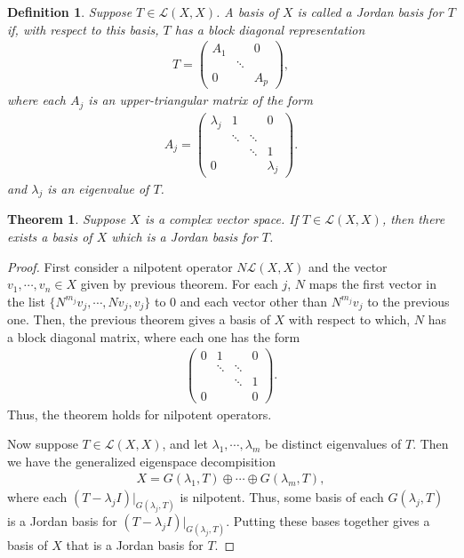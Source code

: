\documentclass[11pt]{book}
\newtheorem{definition}{Definition}[chapter]
\newtheorem{theorem}{Theorem}[chapter]
\theoremstyle{definition}
\numberwithin{equation}{chapter}
\begin{document}
\medskip

\begin{definition}
Suppose $T\in\mathcal{L}(X,X)$. A basis of $X$ is called a Jordan basis for $T$ if, with respect to this basis, $T$ has a block diagonal representation
\begin{align*}
    T = \begin{pmatrix}
    A_1 &  & 0 \\
     & \ddots &  \\
    0 &  & A_p 
    \end{pmatrix},
\end{align*}
where each $A_j$ is an upper-triangular matrix of the form
\begin{align*}
    A_j = \begin{pmatrix}
    \lambda_j & 1 & & 0 \\
     & \ddots &  \ddots & \\
     &  & \ddots & 1 \\
    0 & & & \lambda_j
    \end{pmatrix}.
\end{align*}
and $\lambda_j$ is an eigenvalue of $T$.
\end{definition}

\medskip

\begin{theorem}
Suppose $X$ is a complex vector space. If $T\in\mathcal{L}(X,X)$, then there exists a basis of $X$ which is a Jordan basis for $T$.
\end{theorem}
\begin{proof}
First consider a nilpotent operator $N\mathcal{L}(X,X)$ and the vector $v_1,\cdots,v_n \in X$ given by previous theorem. For each $j$, $N$ maps the first vector in the list $\{N^{m_j}v_j, \cdots, Nv_j,v_j\}$ to $0$ and each vector other than $N^{m_j}v_j$ to the previous one. Then, the previous theorem gives a basis of $X$ with respect to which, $N$ has a block diagonal matrix, where each one has the form 
\begin{align*}
    \begin{pmatrix}
    0 & 1 & & 0 \\
     & \ddots &  \ddots & \\
     &  & \ddots & 1 \\
    0 & & & 0
    \end{pmatrix}.
\end{align*}
Thus, the theorem holds for nilpotent operators. 

Now suppose $T\in\mathcal{L}(X,X)$, and let $\lambda_1,\cdots,\lambda_m$ be distinct eigenvalues of $T$. Then we have the generalized eigenspace decompisition
\begin{align*}
    X = G(\lambda_1, T)\oplus \cdots \oplus G(\lambda_m, T),
\end{align*}
where each $(T-\lambda_j I)|_{G(\lambda_j, T)}$ is nilpotent. Thus, some basis of each $G(\lambda_j,T)$ is a Jordan basis for $(T-\lambda_j I)|_{G(\lambda_j, T)}$. Putting these bases together gives a basis of $X$ that is a Jordan basis for $T$.
\end{proof}
\end{document}
